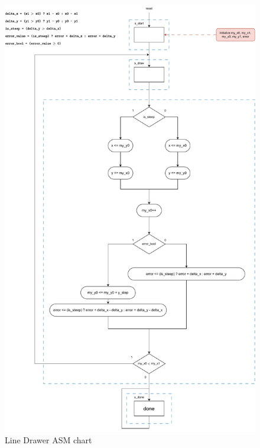 \documentclass[11pt, titlepage]{article}
\begin{document}
            \begin{figure}[H]
                \centering
                \includegraphics[scale = 0.52]{Images/line drawer diagram.pdf}
                \caption{Line Drawer ASM chart}
            \end{figure}
            
\end{document}
